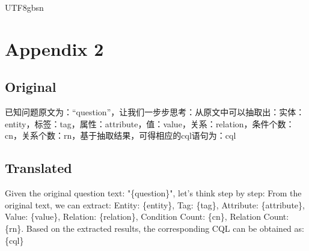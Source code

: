 \documentclass[runningheads]{llncs}
\begin{document}
\begin{CJK*}{UTF8}{gbsn}
\section*{Appendix 2}
\label{appendix_cot_template}
\subsection*{Original}
已知问题原文为：“{question}”，让我们一步步思考：从原文中可以抽取出：实体：{entity}，标签：{tag}，属性：{attribute}，值：{value}，关系：{relation}，条件个数：{cn}，关系个数：{rn}，基于抽取结果，可得相应的cql语句为：{cql}
\subsection*{Translated}
Given the original question text: "\{question\}", let's think step by step: From the original text, we can extract: Entity: \{entity\}, Tag: \{tag\}, Attribute: \{attribute\}, Value: \{value\}, Relation: \{relation\}, Condition Count: \{cn\}, Relation Count: \{rn\}. Based on the extracted results, the corresponding CQL can be obtained as: \{cql\}

%
%
%
% 
% 
%

% 



\end{CJK*}
\end{document}
